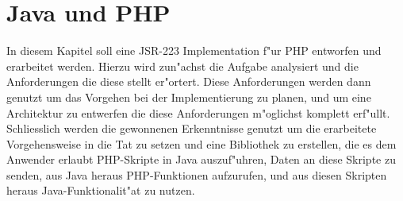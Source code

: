 \chapter{Java und PHP}
\label{sec:chap1}

In diesem Kapitel soll eine JSR-223 Implementation f"ur PHP entworfen und erarbeitet werden. Hierzu wird zun"achst
die Aufgabe analysiert und die Anforderungen die diese stellt er"ortert. Diese Anforderungen werden dann genutzt
um das Vorgehen bei der Implementierung zu planen, und um eine Architektur zu entwerfen die diese Anforderungen 
m"oglichst komplett erf"ullt. Schliesslich werden die gewonnenen Erkenntnisse genutzt um die erarbeitete Vorgehensweise
in die Tat zu setzen und eine Bibliothek zu erstellen, die es dem Anwender erlaubt PHP-Skripte in Java auszuf"uhren,
Daten an diese Skripte zu senden, aus Java heraus PHP-Funktionen aufzurufen, und aus diesen Skripten heraus 
Java-Funktionalit"at zu nutzen.


\clearpage

\clearpage

\clearpage



